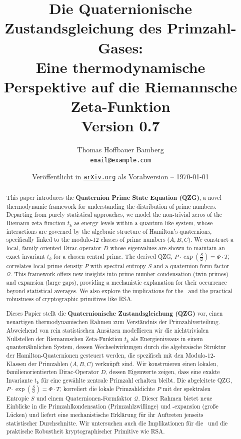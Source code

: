 \documentclass[11pt,twocolumn,a4paper]{article}
\title{Die Quaternionische Zustandsgleichung des Primzahl-Gases: \\ Eine thermodynamische Perspektive auf die Riemannsche Zeta-Funktion \\ \small Version 0.7}
\author{Thomas Hoffbauer \small  Bamberg \\ \small \texttt{email@example.com}}
\date{\small Veröffentlicht in \href{https://arxiv.org/}{\texttt{arXiv.org}} als Vorabversion -- \today}
\newcommand{\entropy}{S}
\newcommand{\formfactor}{\mathcal{Q}}
\newcommand{\pressure}{P}
\newcommand{\temperature}{T}
\newcommand{\bamberger}{\Phi}
\newcommand{\HilPol}{\text{Hilbert-Pólya-Hypothese}}
\theoremstyle{definition}
\begin{document}
\maketitle

\begin{abstract}
This paper introduces the \textbf{Quaternion Prime State Equation (QZG)}, a novel thermodynamic framework for understanding the distribution of prime numbers. Departing from purely statistical approaches, we model the non-trivial zeros of the Riemann zeta function $t_k$ as energy levels within a quantum-like system, whose interactions are governed by the algebraic structure of Hamilton's quaternions, specifically linked to the modulo-12 classes of prime numbers ($A, B, C$). We construct a local, family-oriented Dirac operator $D$ whose eigenvalues are shown to maintain an exact invariant $t_k$ for a chosen central prime. The derived QZG, $\pressure \cdot \exp\left(\frac{\entropy}{\formfactor}\right) = \bamberger \cdot \temperature$, correlates local prime density $\pressure$ with spectral entropy $\entropy$ and a quaternion form factor $\formfactor$. This framework offers new insights into prime number condensation (twin primes) and expansion (large gaps), providing a mechanistic explanation for their occurrence beyond statistical averages. We also explore the implications for the \HilPol\ and the practical robustness of cryptographic primitives like RSA.

\vspace{0.5cm}
Dieses Papier stellt die \textbf{Quaternionische Zustandsgleichung (QZG)} vor, einen neuartigen thermodynamischen Rahmen zum Verständnis der Primzahlverteilung. Abweichend von rein statistischen Ansätzen modellieren wir die nichttrivialen Nullstellen der Riemannschen Zeta-Funktion $t_k$ als Energieniveaus in einem quantenähnlichen System, dessen Wechselwirkungen durch die algebraische Struktur der Hamilton-Quaternionen gesteuert werden, die spezifisch mit den Modulo-12-Klassen der Primzahlen ($A, B, C$) verknüpft sind. Wir konstruieren einen lokalen, familienorientierten Dirac-Operator $D$, dessen Eigenwerte zeigen, dass eine exakte Invariante $t_k$ für eine gewählte zentrale Primzahl erhalten bleibt. Die abgeleitete QZG, $\pressure \cdot \exp\left(\frac{\entropy}{\formfactor}\right) = \bamberger \cdot \temperature$, korreliert die lokale Primzahldichte $\pressure$ mit der spektralen Entropie $\entropy$ und einem Quaternionen-Formfaktor $\formfactor$. Dieser Rahmen bietet neue Einblicke in die Primzahlkondensation (Primzahlzwillinge) und -expansion (große Lücken) und liefert eine mechanistische Erklärung für ihr Auftreten jenseits statistischer Durchschnitte. Wir untersuchen auch die Implikationen für die \HilPol\ und die praktische Robustheit kryptographischer Primitive wie RSA.
\end{abstract}
\end{document}
